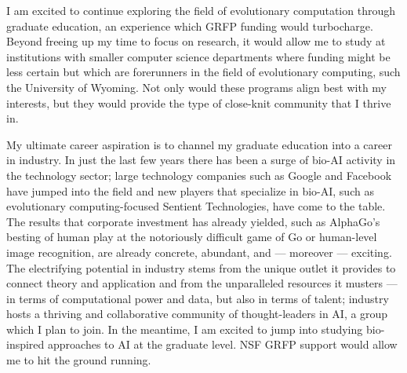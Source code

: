 \documentclass[12pt]{book}
\begin{document}

I am excited to continue exploring the field of evolutionary computation through graduate education, an experience which GRFP funding would turbocharge.
Beyond freeing up my time to focus on research, it would allow me to study at institutions with smaller computer science departments where funding might be less certain but which are forerunners in the field of evolutionary computing, such the University of Wyoming.
Not only would these programs align best with my interests, but they would provide the type of close-knit community that I thrive in.


My ultimate career aspiration is to channel my graduate education into a career in industry.
In just the last few years there has been a surge of bio-AI activity in the technology sector; large technology companies such as Google and Facebook have jumped into the field and new players that specialize in bio-AI, such as evolutionary computing-focused Sentient Technologies, have come to the table.
The results that corporate investment has already yielded, such as AlphaGo's besting of human play at the notoriously difficult game of Go or human-level image recognition, are already concrete, abundant, and --- moreover --- exciting.
The electrifying potential in industry stems from the unique outlet it provides to connect theory and application and from the unparalleled resources it musters --- in terms of computational power and data, but also in terms of talent;
industry hosts a thriving and collaborative community of thought-leaders in AI, a group which I plan to join.
In the meantime, I am excited to jump into studying bio-inspired approaches to AI at the graduate level.
NSF GRFP support would allow me to hit the ground running.
\end{document}
